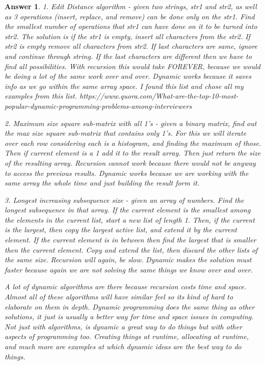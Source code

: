 \documentclass[11pt]{article}
\newtheorem{answer}{Answer}
\begin{document}
\begin{answer}
\label{ans:4}
 1. Edit Distance algorithm - given two strings, str1 and str2, as well as 3 operations (insert, replace, and remove) can be done only on the str1. Find the smallest number of operations that str1 can have done on it to be turned into str2. The solution is if the str1 is empty, insert all characters from the str2. If str2 is empty remove all characters from str2. If last characters are same, ignore and continue through string. If the last characters are different then we have to find all possibilities. With recursion this would take FOREVER, because we would be doing a lot of the same work over and over. Dynamic works because it saves info as we go within the same array space. I found this list and chose all my examples from this list. https://www.quora.com/What-are-the-top-10-most-popular-dynamic-programming-problems-among-interviewers
 
 \bigskip
 
 2. Maximum size square sub-matrix with all 1's - given a binary matrix, find out the max size square sub-matrix that contains only 1's. For this we will iterate over each row considering each is a histogram, and finding the maximum of those. Then if current element is a 1 add it to the result array. Then just return the size of the resulting array. Recursion cannot work because there would not be anyway to access the previous results. Dynamic works because we are working with the same array the whole time and just building the result form it.
 
 \bigskip
 
 3. Longest increasing subsequence size - given an array of numbers. Find the longest subsequence in that array. If the current element is the smallest among the elements in the current list, start a new list of length 1. Then, if the current is the largest, then copy the largest active list, and extend it by the current element. If the current element is in between then find the largest that is smaller then the current element. Copy and extend the list, then discard the other lists of the same size. Recursion will again, be slow. Dynamic makes the solution must faster because again we are not solving the same things we know over and over.
 
 \bigskip
 
 A lot of dynamic algorithms are there because recursion costs time and space. Almost all of these algorithms will have similar feel so its kind of hard to elaborate on them in depth. Dynamic programming does the same thing as other solutions, it just is usually a better way for time and space issues in computing. Not just with algorithms, is dynamic a great  way to do things but with other aspects of programming too. Creating things at runtime, allocating at runtime, and much more are examples at which dynamic ideas are the best way to do things. 
\end{answer}
\end{document}
